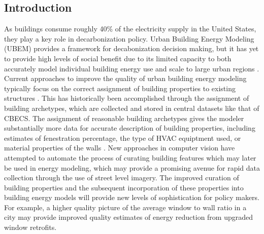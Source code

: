 \documentclass[preprint,review,12pt]{elsarticle}
\begin{document}
\begin{linenumbers}
\section{Introduction}
\label{intro}
As buildings consume roughly 40\% of the electricity supply in the United States, they play a key role in decarbonization policy. Urban Building Energy Modeling (UBEM) provides a framework for decabonization decision making, but it has yet to provide high levels of social benefit due to its limited capacity to both accurately model individual building energy use and scale to large urban regions \cite{reinhart_urban_2016}. Current approaches to improve the quality of urban building energy modeling typically focus on the correct assignment of building properties to existing structures \cite{cerezo_comparison_2017}\cite{nagpal_methodology_2019}. This has historically been accomplished through the assignment of building archetypes, which are collected and stored in central datasets like that of CBECS. The assignment of reasonable building archetypes gives the modeler substantially more data for accurate description of building properties, including estimates of fenestration percentage, the type of HVAC equiptment used, or material properties of the walls \cite{dogan_shoeboxer_2017}. New approaches in computer vision have attempted to automate the process of curating building features which may later be used in energy modeling, which may provide a promising avenue for rapid data collection through the use of street level imagery. The improved curation of building properties and the subsequent incorporation of these properties into building energy models will provide new levels of sophistication for policy makers. For example, a higher quality picture of the average window to wall ratio in a city may provide improved quality estimates of energy reduction from upgraded window retrofits.


\end{linenumbers}
\end{document}
